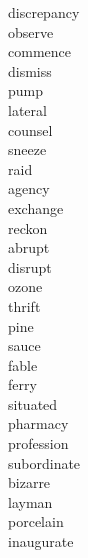 \documentclass[a4paper, 11pt]{ctexart}
\begin{document}
\begin{multicols*}{3}
\begin{description}
\item[discrepancy]

\item[observe]

\item[commence]

\item[dismiss]

\item[pump]

\item[lateral]

\item[counsel]

\item[sneeze]

\item[raid]

\item[agency]

\item[exchange]

\item[reckon]

\item[abrupt]

\item[disrupt]

\item[ozone]

\item[thrift]

\item[pine]

\item[sauce]

\item[fable]

\item[ferry]

\item[situated]

\item[pharmacy]

\item[profession]

\item[subordinate]

\item[bizarre]

\item[layman]

\item[porcelain]

\item[inaugurate]


\end{description}
\end{multicols*}
\end{document}
